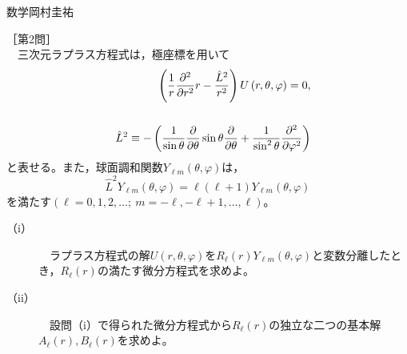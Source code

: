 \documentclass[fleqn]{jbook}
\begin{document}
\begin{question}{数学}{岡村圭祐}
\begin{description}
    \end{description}


\newpage


\setcounter{equation}{0}


［第2問］\\

　三次元ラプラス方程式は，極座標を用いて
    \begin{eqnarray}
  &&\left( {\frac{1}{r}\frac{{\partial ^2 }}{{\partial r^2 }}r - \frac{{\hat L^2 }}{{r^2 }}} \right)U\left( {r,\theta ,\varphi } \right) = 0, \\ 
  && \cr
  &&\hat L^2  \equiv  - \left( {\frac{1}{{\sin \theta }}\frac{\partial }{{\partial \theta }}\sin \theta \frac{\partial }{{\partial \theta }} + \frac{1}{{\sin ^2 \theta }}\frac{{\partial ^2 }}{{\partial \varphi ^2 }}} \right) 
    \end{eqnarray}
    と表せる。また，球面調和関数$Y_{\ell m}\left( \theta,\varphi \right)$は，
    \begin{equation}
    \hat L^2Y_{\ell m}\left( \theta,\varphi \right)=\ell \left( \ell +1 \right)Y_{\ell m}\left( \theta,\varphi \right)
    \end{equation}
    を満たす$\left( \ell =0,1,2,\dots;~m=-\ell,-\ell+1,\dots,\ell \right)$。\\
    
    
    \begin{description}
    
        \item[{\rm （i）}] 　ラプラス方程式の解$U\left( r,\theta,\varphi \right)$を$R_\ell\left( r \right)Y_{\ell m}\left( \theta,\varphi \right)$と変数分離したとき，$R_\ell\left( r \right)$の満たす微分方程式を求めよ。\\
        
        \item[{\rm （ii）}] 　設問（i）で得られた微分方程式から$R_\ell\left( r \right)$の独立な二つの基本解$A_\ell\left( r \right),B_\ell\left( r \right)$を求めよ。\\
    \end{description}
    

\end{question}
\end{document}
